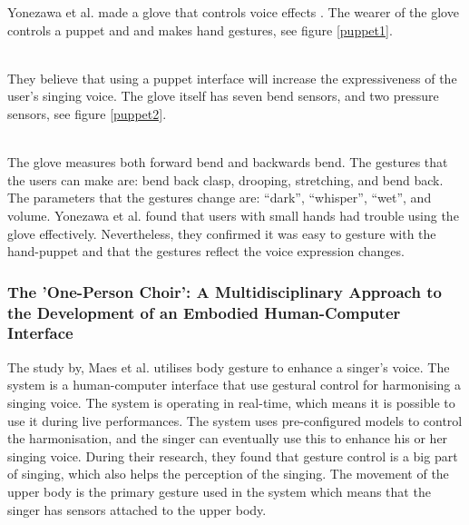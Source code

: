 Yonezawa et al. made a glove that controls voice effects \citep{Yonezawa_2005}. The wearer of the glove controls a puppet and and makes hand gestures, see figure \ref{puppet1}. \\

\begin{minipage}{\linewidth}%
\label{puppet1}
\end{minipage}\\

They believe that using a puppet interface will increase the expressiveness of the user’s singing voice. The glove itself has seven bend sensors, and two pressure sensors, see figure \ref{puppet2}. \\

\begin{minipage}{\linewidth}%
\label{puppet2}
\end{minipage}\\

The glove measures both forward bend and backwards bend. The gestures that the users can make are: bend back clasp, drooping, stretching, and bend back. The parameters that the gestures change are: “dark”, “whisper”, “wet”, and volume. Yonezawa et al. found that users with small hands had trouble using the glove effectively. Nevertheless, they confirmed it was easy to gesture with the hand-puppet and that the gestures reflect the voice expression changes.

\subsubsection{The 'One-Person Choir': A Multidisciplinary Approach to the Development of an Embodied Human-Computer Interface}
The study by, Maes et al. \citep{Maes_2011} utilises body gesture to enhance a singer's voice. The system is a human-computer interface that use gestural control for harmonising a singing voice. The system is operating in real-time, which means it is possible to use it during live performances. The system uses pre-configured models to control the harmonisation, and the singer can eventually use this to enhance his or her singing voice. 
During their research, they found that gesture control is a big part of singing, which also helps the perception of the singing. The movement of the upper body is the primary gesture used in the system which means that the singer has sensors attached to the upper body.

